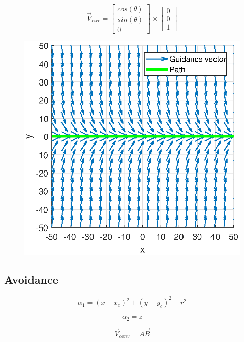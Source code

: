 \documentclass[conf]{new-aiaa}
\begin{document}
\begin{equation}
\label{zPlane}
\overrightarrow{V}_{circ} = \begin{bmatrix}
cos(\theta) \\
sin(\theta) \\
0
\end{bmatrix} 
\times
\begin{bmatrix}
0 \\
0 \\
1
\end{bmatrix}
\end{equation}






\begin{figure}[H]
	\centering
	\includegraphics[width=0.7\linewidth]{Figures/methods/straightPath}
	\caption{}
	\label{fig:straightpath}
\end{figure}

\subsection{Avoidance}

\begin{equation}\label{eq:alpha1}
\alpha_1 = (x-x_c)^2 + (y-y_c)^2-r^2
\end{equation}


\begin{equation}\label{eq:alpha2}
\alpha_2 = z
\end{equation}

\begin{equation}
\overrightarrow{V}_{conv} = A\overrightarrow{B}
\end{equation}
\end{document}
